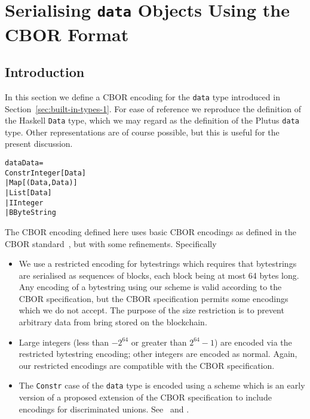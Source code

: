 \chapter{Serialising \texttt{data} Objects Using the CBOR Format}
\label{appendix:data-cbor-encoding}

\section{Introduction}
In this section we define a CBOR encoding for the \texttt{data} type introduced
in Section~\ref{sec:built-in-types-1}.  For ease of reference we reproduce
the definition of the Haskell \texttt{Data} type, which we may regard as the
definition of the Plutus \texttt{data} type. Other representations are of course
possible, but this is useful for the present discussion.

\begin{alltt}
   data Data =
      Constr Integer [Data]
      | Map [(Data, Data)]
      | List [Data]
      | I Integer
      | B ByteString
\end{alltt}

\noindent The CBOR encoding defined here uses basic CBOR encodings as defined in
the CBOR standard~\cite{rfc8949-CBOR}, but with some refinements. Specifically

\begin{itemize}
\item We use a restricted encoding for bytestrings which requires that
  bytestrings are serialised as sequences of blocks, each block being at most 64
  bytes long.  Any encoding of a bytestring using our scheme is valid according
  to the CBOR specification, but the CBOR specification permits some encodings
  which we do not accept. The purpose of the size restriction is to prevent
  arbitrary data from bring stored on the blockchain.
\item Large integers (less than $-2^{64}$ or greater than $2^{64}-1$) are
  encoded via the restricted bytestring encoding; other integers are encoded as
  normal. Again, our restricted encodings are compatible with the CBOR
  specification.
\item The \texttt{Constr} case of the \texttt{data} type is encoded using a
  scheme which is an early version of a proposed extension of the CBOR
  specification to include encodings for discriminated unions.
  See~\cite{CBOR-alternatives} and \cite[Section 9.1]{CBOR-notable-tags}.
  \end{itemize}


